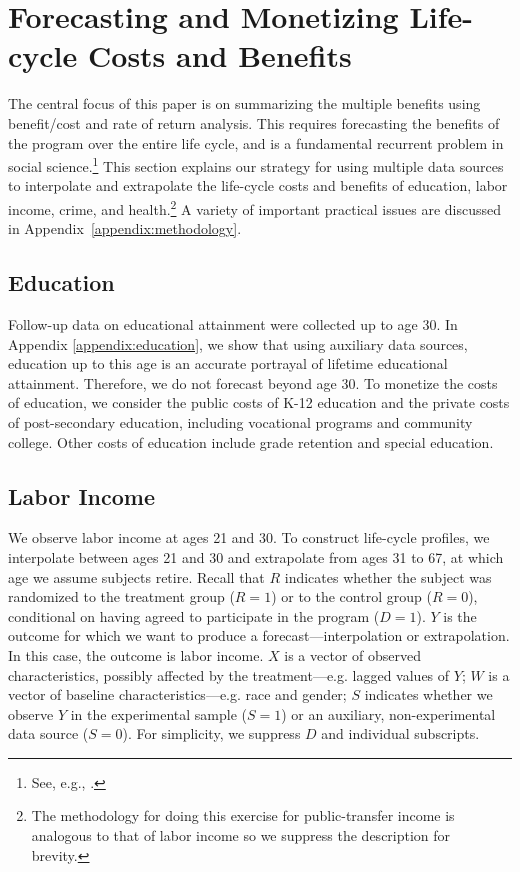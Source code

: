\section{Forecasting and Monetizing Life-cycle Costs and Benefits}\label{section:cbamethodology}

The central focus of this paper is on summarizing the multiple benefits using benefit/cost and rate of return analysis. This requires forecasting the benefits of the program over the entire life cycle, and is a fundamental recurrent problem in social science.\footnote{See, e.g., \cite{Heckman_Lochner_ea_2006_HEE}.} This section explains our strategy for using multiple data sources to interpolate and extrapolate the life-cycle costs and benefits of education, labor income, crime, and health.\footnote{The methodology for doing this exercise for public-transfer income is analogous to that of labor income so we suppress the description for brevity.} A variety of important practical issues are discussed in Appendix~\ref{appendix:methodology}.

\subsection{Education}

Follow-up data on educational attainment were collected up to age 30. In Appendix \ref{appendix:education}, we show that using auxiliary data sources, education up to this age is an accurate portrayal of lifetime educational attainment. Therefore, we do not forecast beyond age 30. To monetize the costs of education, we consider the public costs of K-12 education and the private costs of post-secondary education, including vocational programs and community college. Other costs of education include grade retention and special education.

\subsection{Labor Income}

We observe labor income at ages 21 and 30. To construct life-cycle profiles, we interpolate between ages 21 and 30 and extrapolate from ages 31 to 67, at which age we assume subjects retire. Recall that $R$ indicates whether the subject was randomized to the treatment group ($R=1$) or to the control group ($R=0$), conditional on having agreed to participate in the program ($D = 1$). $Y$ is the outcome for which we want to produce a forecast---interpolation or extrapolation. In this case, the outcome is labor income. $X$ is a vector of observed characteristics, possibly affected by the treatment---e.g. lagged values of $Y$; $W$ is a vector of baseline characteristics---e.g. race and gender; $S$ indicates whether we observe $Y$ in the experimental sample ($S=1$) or an auxiliary, non-experimental data source ($S=0$). For simplicity, we suppress $D$ and individual subscripts. \\

